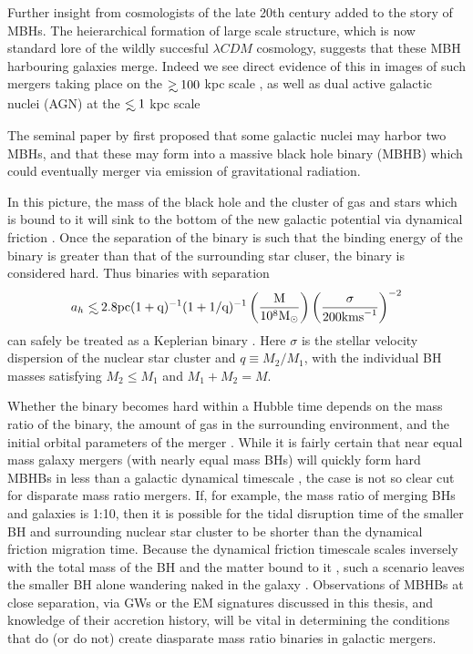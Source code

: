 Further insight from cosmologists of the late 20th century added to the story of MBHs. The heierarchical formation of large scale structure, which is now standard lore of the wildly succesful $\lambda CDM$ \citep{LCDM} cosmology, suggests that these MBH harbouring galaxies merge. Indeed we see direct evidence of this in images of such mergers taking place on the $\gsim 100$ kpc scale \citep[see][and references therein]{DottiSesanaDecarli:2011}, as well as dual active galactic nuclei (AGN) at the $\lsim 1$ kpc scale \citep{Komossa:2003, Fabbiano+2011, Rodriguez:2006, Burke-Spolaor:2011, ColpiDotti:2009, Woo:2014}


The seminal paper by \cite{BBR:1980} first proposed that some galactic nuclei
may harbor two MBHs, and that these may form into a massive black hole binary
(MBHB) which could eventually merger via emission of gravitational radiation.

In this picture, the mass of the black hole and the cluster of gas and stars
which is bound to it will sink to the bottom of the new galactic potential via
dynamical friction \citep{}. Once the separation of the binary is such that
the binding energy of the binary is greater than that of the surrounding star
cluser, the binary is considered hard. Thus binaries with separation
\begin{equation}
a_h \lsim 2.8 \rm{pc} (1+q)^{-1} (1+1/q)^{-1}  \left( \frac{M}{10^8 \Msun} \right) \left( \frac{\sigma}{200 \rm{km s}^{-1}} \right)^{-2}
\end{equation}
can safely be treated as a Keplerian binary
\citep[\emph{e.g.}][]{MerrittMilos:2005}. Here $\sigma$ is the stellar
velocity dispersion of the nuclear star cluster and $q\equiv M_2/M_1$, with
the individual BH masses satisfying $M_2 \leq M_1$ and $M_1+M_2=M$.

Whether the binary becomes hard within a Hubble time depends on the mass ratio
of the binary, the amount of gas in the surrounding environment, and the
initial orbital parameters of the merger \citep{Mayer:2011}. While it is
fairly certain that near equal mass galaxy mergers (with nearly equal mass
BHs) will quickly form hard MBHBs in less than a galactic dynamical timescale
\citep{Mayer:2007, Chapon:2013}, the case is not so clear cut for disparate
mass ratio mergers. If, for example, the mass ratio of merging BHs and
galaxies is 1:10, then it is possible for the tidal disruption time of the
smaller BH and surrounding nuclear star cluster to be shorter than the
dynamical friction migration time. Because the dynamical friction timescale
scales inversely with the total mass of the BH and the matter bound to it
\citep{Chandra:1943, ColpiDotti:2009}, such a scenario leaves the smaller BH
alone wandering naked in the galaxy \citep{Callegari:2011, Mayer:2013}.
Observations of MBHBs at close separation, via GWs or the EM signatures
discussed in this thesis, and knowledge of their accretion history, will be
vital in determining the conditions that do (or do not) create diasparate mass
ratio binaries in galactic mergers.

